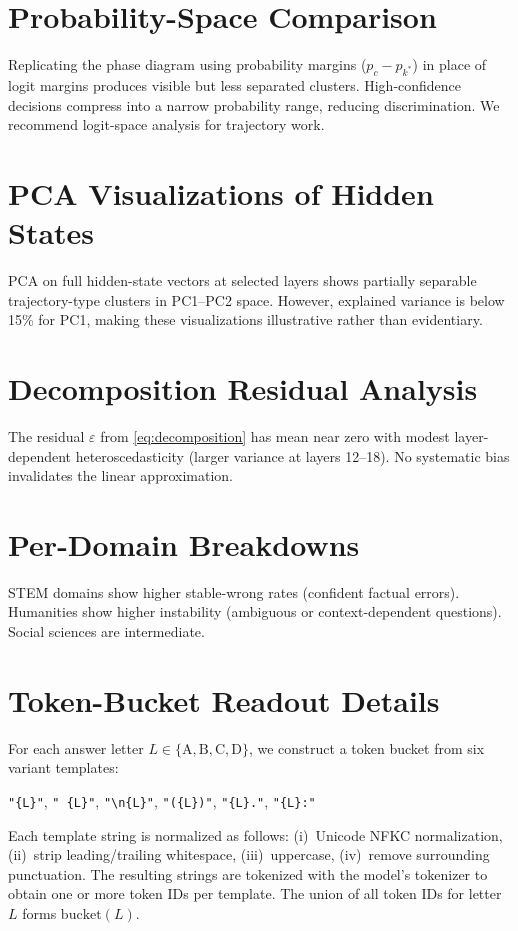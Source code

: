 \documentclass{article}
\begin{document}
\section{Probability-Space Comparison}
\label{sec:appendix_prob}

Replicating the phase diagram using probability margins ($p_c - p_{k^*}$) in place of logit margins produces visible but less separated clusters.  High-confidence decisions compress into a narrow probability range, reducing discrimination.  We recommend logit-space analysis for trajectory work.

\section{PCA Visualizations of Hidden States}
\label{sec:appendix_pca}

PCA on full hidden-state vectors at selected layers shows partially separable trajectory-type clusters in PC1--PC2 space.  However, explained variance is below 15\% for PC1, making these visualizations illustrative rather than evidentiary.

\section{Decomposition Residual Analysis}

The residual $\varepsilon$ from \cref{eq:decomposition} has mean near zero with modest layer-dependent heteroscedasticity (larger variance at layers 12--18).  No systematic bias invalidates the linear approximation.

\section{Per-Domain Breakdowns}

STEM domains show higher stable-wrong rates (confident factual errors).  Humanities show higher instability (ambiguous or context-dependent questions).  Social sciences are intermediate.

\section{Token-Bucket Readout Details}
\label{sec:appendix_buckets}

For each answer letter $L \in \{\mathrm{A}, \mathrm{B}, \mathrm{C}, \mathrm{D}\}$, we construct a token bucket from six variant templates:
\begin{center}
\texttt{"\{L\}"},\; \texttt{" \{L\}"},\; \texttt{"\textbackslash n\{L\}"},\; \texttt{"(\{L\})"},\; \texttt{"\{L\}."},\; \texttt{"\{L\}:"}
\end{center}
Each template string is normalized as follows: (i)~Unicode NFKC normalization, (ii)~strip leading/trailing whitespace, (iii)~uppercase, (iv)~remove surrounding punctuation.  The resulting strings are tokenized with the model's tokenizer to obtain one or more token IDs per template.  The union of all token IDs for letter $L$ forms $\mathrm{bucket}(L)$.
\end{document}
